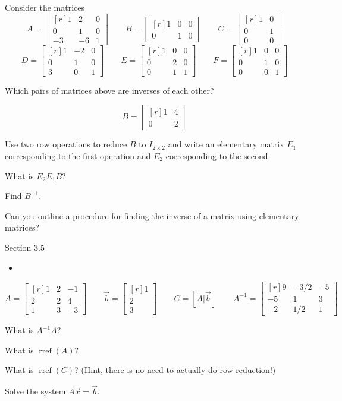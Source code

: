 \documentclass{problemset}
\DeclareMathOperator{\Rref}{rref}
\newcommand{\rref}{\Rref}
\newcommand{\mat}[1]{\begin{bmatrix*}[r]#1\end{bmatrix*}}
\begin{document}
	\question
	Consider the matrices 
	\[
		A=\mat{1&2&0\\0&1&0\\-3&-6&1}\qquad
		B=\mat{1&0&0\\0&1&0}\qquad
		C=\mat{1&0\\0&1\\0&0}
	\]
	\[
		D=\mat{1&-2&0\\0&1&0\\3&0&1}\qquad
		E=\mat{1&0&0\\0&2&0\\0&1&1}\qquad
		F=\mat{1&0&0\\0&1&0\\0&0&1}
	\]
	\begin{parts}
		\item Which pairs of matrices above are inverses of each other?
	\end{parts}

	\question
	\[
		B=\mat{1 &4\\0 &2}
	\]
	\begin{parts}
		\item Use two row operations to reduce $B$ to $I_{2\times 2}$
		and write an elementary matrix $E_1$ corresponding to the first operation
		and $E_2$ corresponding to the second.
		\item What is $E_2E_1B$?
		\item Find $B^{-1}$.
		\item Can you outline a procedure for finding the inverse of a matrix
		using elementary matrices?
	\end{parts}

\begin{lesson}
	\newpage

	Section 3.5

	\begin{itemize}
		\item 
	\end{itemize}


	\newpage
\end{lesson}
	\question
	\[
		A=\mat{1&2&-1\\2&2&4\\1&3&-3}\qquad
		\vec b=\mat{1\\2\\3}\qquad
		C=[A|\vec b]\qquad
		A^{-1}=\mat{9&-3/2&-5\\-5&1&3\\-2&1/2&1}
	\]
	\begin{parts}
		\item What is $A^{-1}A$?
		\item What is $\rref(A)$?
		\item What is $\rref(C)$? (Hint, there is no need to actually do row reduction!)
		\item Solve the system $A\vec x=\vec b$.
	\end{parts}
\end{document}
